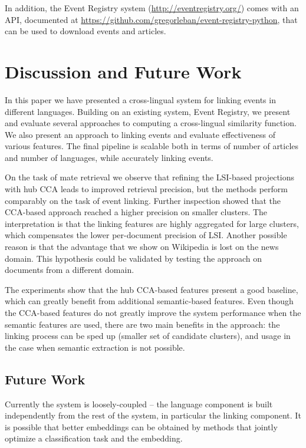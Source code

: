 \documentclass[twoside,11pt]{article}
\begin{document}
In addition, the Event Registry system (\url{http://eventregistry.org/}) comes with an API, documented at \url{https://github.com/gregorleban/event-registry-python}, that can be used to download events and articles.

\section{Discussion and Future Work}

In this paper we have presented a cross-lingual system for linking events in different languages. Building on an existing system, Event Registry, we present and evaluate several approaches to computing a  cross-lingual similarity function. We also present an approach to linking events and evaluate effectiveness of various features.  The  final pipeline is scalable both in terms of number of articles and number of languages, while accurately linking events.

On the task of mate retrieval we observe that refining the LSI-based projections with hub CCA leads to improved retrieval precision, but the methods perform comparably on the task of event linking. Further inspection showed that the CCA-based approach reached a higher precision on smaller clusters. The interpretation is that the linking features are highly aggregated for large clusters, which compensates the lower per-document precision of LSI. Another possible reason is that the advantage that we show on Wikipedia is lost on the news domain. This hypothesis could be validated by testing the approach on documents from a different domain.

The experiments show that the hub CCA-based features present a good baseline, which can greatly benefit from additional semantic-based features. Even though the CCA-based features do not greatly improve the system performance when the semantic features are used, there are two main benefits in the approach: the linking process can be sped up (smaller set of candidate clusters), and usage in the case when semantic extraction is not possible.

\subsection{Future Work}

Currently the system is loosely-coupled -- the language component is built independently from the rest of the system, in particular the linking component. It is possible that better embeddings can be obtained by methods that jointly optimize a classification task and the embedding.
		
\end{document}
